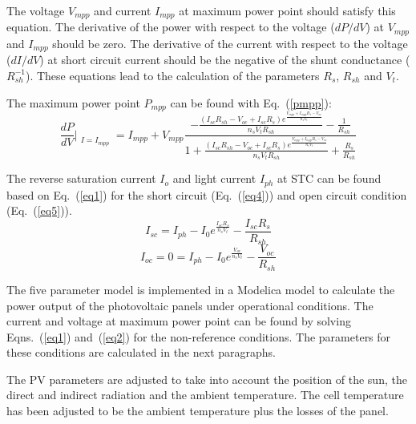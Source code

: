 The voltage $V_{mpp}$ and current $I_{mpp}$ at maximum power point should satisfy this equation. The derivative of the power with respect to the voltage ($dP/dV$) at $V_{mpp}$ and $I_{mpp}$ should be zero. The derivative of the current with respect to the voltage ($dI/dV$) at short circuit current should be the negative of the shunt conductance ($R_{sh}^{-1}$). These equations lead to the calculation of the parameters $R_{s}$, $R_{sh}$ and $V_{t}$.

The maximum power point $P_{mpp}$ can be found with Eq.~(\ref{pmpp}):
\begin{equation}
\frac{dP}{dV} \Bigr\vert_{\substack{I=I_{mpp}}} = I_{mpp} + V_{mpp} \frac{-\frac{(I_{sc} R_{sh} - V_{oc} + I_{sc} R_{s}) e^{\frac{V_{mpp} + I_{mpp} R_{s} - V_{oc}}{n_{s} V_{t}}}}{n_{s} V_{t} R_{sh}} - \frac{1}{R_{sh}}}{1 + \frac{(I_{sc} R_{sh} - V_{oc} + I_{sc} R_{s}) e^{\frac{V_{mpp} + I_{mpp} R_{s} - V_{oc}}{n_{s} V_{t}}}}{n_{s} V_{t} R_{sh}} + \frac{R_{s}}{R_{sh}}}
\label{pmpp}
\end{equation}

The reverse saturation current $I_{o}$ and light current $I_{ph}$ at STC can be found based on Eq.~(\ref{eq1}) for the short circuit (Eq.~(\ref{eq4})) and open circuit condition (Eq.~(\ref{eq5})).
\begin{equation}
I_{sc} = I_{ph} - I_{0} e^{\frac{I_{sc} R_{s}}{n_{s} V_{t}}} - \frac{I_{sc} R_{s}}{R_{sh}}
\label{eq4}
\end{equation}
\begin{equation}
I_{oc} = 0 = I_{ph} - I_{0} e^{\frac{V_{oc}}{n_{s} V_{t}}} - \frac{V_{oc}}{R_{sh}}
\label{eq5}
\end{equation}

The five parameter model is implemented in a Modelica model to calculate the power output of the photovoltaic panels under operational conditions. The current and voltage at maximum power point can be found by solving Eqns.~(\ref{eq1}) and~(\ref{eq2}) for the non-reference conditions. The parameters for these conditions are calculated in the next paragraphs.

The PV parameters are adjusted to take into account the position of the sun, the direct and indirect radiation and the ambient temperature. The cell temperature has been adjusted to be the ambient temperature plus the losses of the panel.

